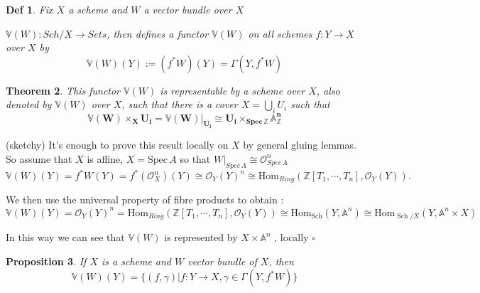 \documentclass{article}
\newtheorem{theorem}{Theorem}[section]
\newtheorem{definition}[theorem]{Def}
\newtheorem{proposition}[theorem]{Proposition}
\newenvironment{Proof}{{\noindent \indent \it Proof:\quad}}{\hfill $\square$\par}
\begin{document}
\begin{definition}
    Fix $X$ a scheme and $W$ a vector bundle over $X$

    $\mathbb V(W):Sch/X\to Sets$, then  defines a functor $\mathbb{V}(W)$ on all schemes $f:Y\to X$ over $X$ by
$$
\mathbb V(W)(Y):=(f^{\ast}{W})(Y)=\Gamma(Y,f^{\ast}{W})
$$
\end{definition}

\begin{theorem}
This functor $\mathbb V(W)$ is representable by a scheme over $X$, also denoted by $\mathbb V(W)$ over $X$, such that there is a cover
 $\textstyle X=\bigcup_{i}U_{i}$ such that
$$
\bm{\mathbb{V}({W})\times_{X}U_{i}=\mathbb{V}({W})|_{U_{i}}\cong U_{i}\times_{Spec\,\mathbb Z}\mathbb{A}_{\mathbb Z}^{n}}
$$
\end{theorem}
\begin{Proof}
    (sketchy)  It's enough to prove this result locally on $X$  by general gluing lemmas. So assume that $X$ is affine, $X={\mathrm{Spec}}\,A$ so that $W|_{Spec\, A}\cong\mathcal O_{Spec\,A}^n$
$$
\mathbb V({W})(Y)
=f^{\ast}{W}(Y)=f^{*}({\mathcal{O}}_{X}^n)(Y)
\cong{\mathcal{O}}_{Y}(Y)^n
\cong{\mathrm{Hom}}_{R i n g}(\mathbb{Z}[T_1,\cdots,T_n],{\mathcal{O}}_{Y}(Y)). 
$$

We then use the universal property of fibre products to obtain :
$$
\mathbb V({W})(Y)
=\mathcal O_{Y}(Y)^n
={\mathrm{Hom}}_{R i n g}(\mathbb{Z}[T_1,\cdots,T_n],\mathcal O_{Y}(Y))\cong{\mathrm{Hom}}_{\operatorname{Sch}}(Y,\mathbb{A}^{n})\cong{\mathrm{Hom}}_{\operatorname{Sch}/X}(Y,\mathbb{A}^{n}\times X)
$$

In this way we can see that $\mathbb V({W})$ is represented by $X\times\mathbb{A}^{n}$ , locally
\end{Proof}

\begin{proposition}
    If $X$ is a scheme and $W$ vector bundle of $X$, then
    $$
    \mathbb V(W)(Y)=\{(f,\gamma)|f:Y\to X,\gamma\in\Gamma(Y,f^\ast W)\}
    $$
\end{proposition}
\end{document}

